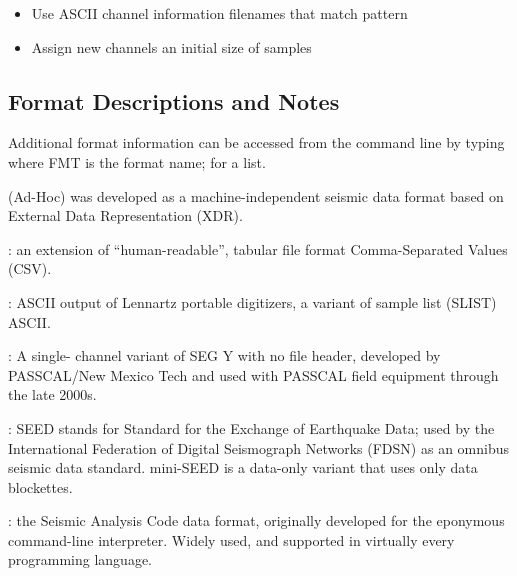 \documentclass[letterpaper,11pt,english]{sphinxmanual}
\begin{document}
\begin{enumerate}
\begin{description}
\begin{itemize}
\item {} 
Use ASCII channel information filenames that match pattern 

\item {} 
Assign new channels an initial size of  samples

\end{itemize}

\end{description}

\end{enumerate}


\subsection{Format Descriptions and Notes}
\label{\detokenize{src/Formats/timeseries:format-descriptions-and-notes}}
Additional format information can be accessed from the command line by typing
 where FMT is the format name; 
for a list.

 (Ad-Hoc) was developed as a machine-independent seismic data format
based on External Data Representation (XDR).

: an extension of
“human-readable”, tabular file format Comma-Separated Values (CSV).

: ASCII output of Lennartz portable digitizers, a variant of
sample list (SLIST) ASCII.

: A single-
channel variant of SEG Y with no file header, developed by PASSCAL/New Mexico
Tech and used with PASSCAL field equipment through the late 2000s.

: SEED stands for
Standard for the Exchange of Earthquake Data; used by the International
Federation of Digital Seismograph Networks (FDSN) as an omnibus seismic data
standard. mini-SEED is a data-only variant that uses only data blockettes.

: the
Seismic Analysis Code data format, originally developed for the eponymous
command-line interpreter. Widely used, and supported in virtually every
programming language.
\end{document}
